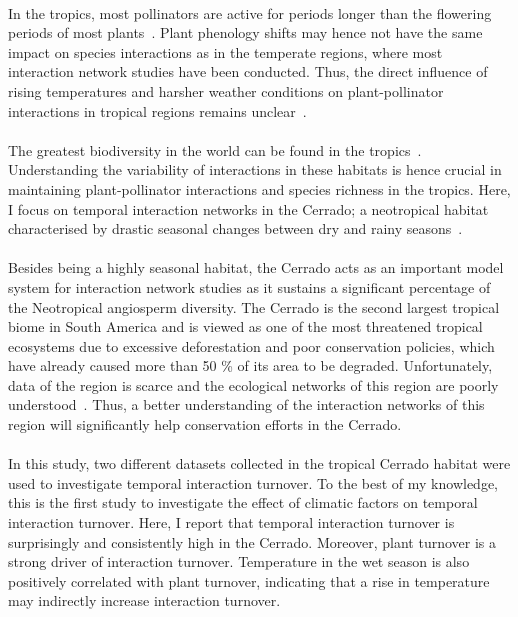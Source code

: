 \documentclass[11pt]{article}
\begin{document}
\\
In the tropics, most pollinators are active for periods longer than the flowering periods of most plants~\citep{Biesmeijer2006}. Plant phenology shifts may hence not have the same impact on species interactions as in the temperate regions, where most interaction network studies have been conducted. Thus, the direct influence of rising temperatures and harsher weather conditions on plant-pollinator interactions in tropical regions remains unclear~\citep{Schweiger2010}.  \\
\\
The greatest biodiversity in the world can be found in the tropics~\citep{Brown2014}. Understanding the variability of interactions in these habitats is hence crucial in maintaining plant-pollinator interactions and species richness in the tropics. Here, I focus on temporal interaction networks in the Cerrado; a neotropical habitat characterised by drastic seasonal changes between dry and rainy seasons~\citep{Kricher2011}.\\
\\
Besides being a highly seasonal habitat, the Cerrado acts as an important model system for interaction network studies as it sustains a significant percentage of the Neotropical angiosperm diversity. The Cerrado is the second largest tropical biome in South America and is viewed as one of the most threatened tropical ecosystems due to excessive deforestation and poor conservation policies, which have already caused more than 50 \% of its area to be degraded. Unfortunately, data of the region is scarce and the ecological networks of this region are poorly understood~\citep{Myers2000, KLINK2005}. Thus, a better understanding of the interaction networks of this region will significantly help conservation efforts in the Cerrado.\\
\\
In this study, two different datasets collected in the tropical Cerrado habitat were used to investigate temporal interaction turnover. To the best of my knowledge, this is the first study to investigate the effect of climatic factors on temporal interaction turnover. Here, I report that temporal interaction turnover is surprisingly and consistently high in the Cerrado. Moreover, plant turnover is a strong driver of interaction turnover. Temperature in the wet season is also positively correlated with plant turnover, indicating that a rise in temperature may indirectly increase interaction turnover. 
\end{document}
